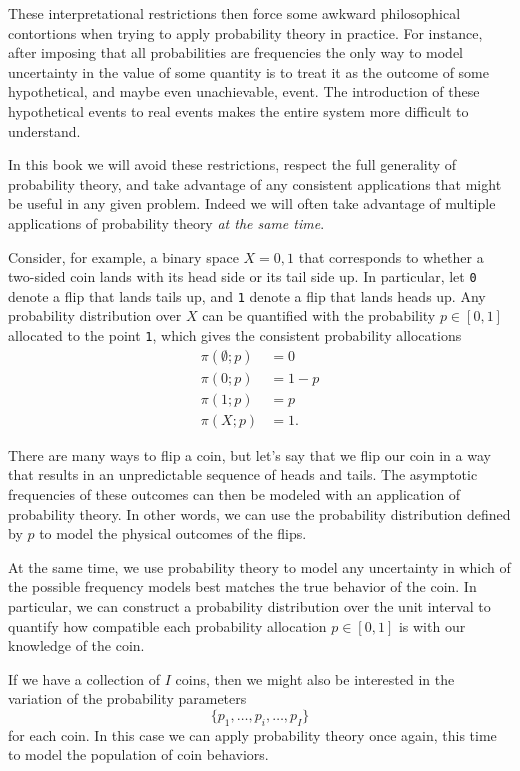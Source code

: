 \documentclass[
  letterpaper,
  DIV=11,
  numbers=noendperiod]{scrartcl}
\begin{document}
These interpretational restrictions then force some awkward
philosophical contortions when trying to apply probability theory in
practice. For instance, after imposing that all probabilities are
frequencies the only way to model uncertainty in the value of some
quantity is to treat it as the outcome of some hypothetical, and maybe
even unachievable, event. The introduction of these hypothetical events
to real events makes the entire system more difficult to understand.

In this book we will avoid these restrictions, respect the full
generality of probability theory, and take advantage of any consistent
applications that might be useful in any given problem. Indeed we will
often take advantage of multiple applications of probability theory
\emph{at the same time}.

Consider, for example, a binary space \(X = {0, 1}\) that corresponds to
whether a two-sided coin lands with its head side or its tail side up.
In particular, let \texttt{0} denote a flip that lands tails up, and
\texttt{1} denote a flip that lands heads up. Any probability
distribution over \(X\) can be quantified with the probability
\(p \in [0, 1]\) allocated to the point \texttt{1}, which gives the
consistent probability allocations \begin{align*}
\pi( \emptyset; p ) &= 0
\\
\pi( {0}; p ) &= 1 - p
\\
\pi( {1}; p ) &= p
\\
\pi( X; p ) &= 1.
\end{align*}

There are many ways to flip a coin, but let's say that we flip our coin
in a way that results in an unpredictable sequence of heads and tails.
The asymptotic frequencies of these outcomes can then be modeled with an
application of probability theory. In other words, we can use the
probability distribution defined by \(p\) to model the physical outcomes
of the flips.

At the same time, we use probability theory to model any uncertainty in
which of the possible frequency models best matches the true behavior of
the coin. In particular, we can construct a probability distribution
over the unit interval to quantify how compatible each probability
allocation \(p \in [0, 1]\) is with our knowledge of the coin.

If we have a collection of \(I\) coins, then we might also be interested
in the variation of the probability parameters \[
\{ p_{1}, \ldots, p_{i}, \ldots, p_{I} \}
\] for each coin. In this case we can apply probability theory once
again, this time to model the population of coin behaviors.
\end{document}
